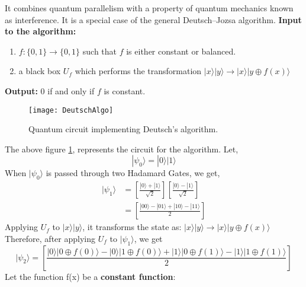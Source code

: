 \documentclass[12pt]{report}
\begin{document}
It combines quantum parallelism with a property of quantum mechanics known as interference. It is a special case of the general Deutsch–Jozsa algorithm. \newline
\textbf{Input to the algorithm:}
\begin{enumerate}
	\item $f:  \{0,1\} \to \{0,1\}$ such that ${f}$ is either constant or balanced.
	\item a black box $U_{f}$ which performs the transformation  $|x\rangle|y\rangle \to |x\rangle|y\oplus f(x)\rangle$
\end{enumerate}
\textbf{Output:} 0 if and only if $f$ is constant.
\begin{figure}[h]
\centering
\texttt{[image: DeutschAlgo]}
\caption{Quantum circuit implementing Deutsch's algorithm.}
\label{fig:deutschalgo}
\end{figure}
\newline The above figure \ref{fig:deutschalgo}, represents the circuit for the algorithm.
\linebreak
Let,
\begin{equation}
|\psi_{0}\rangle = |0\rangle|1\rangle
\end{equation} 
\newline
When $|\psi_{0}\rangle$ is passed through two Hadamard Gates, we get,\newline
\begin{equation}
\begin{split}
|\psi_{1}\rangle & = \left[\frac{|0\rangle+|1\rangle}{\sqrt{2}}\right]\left[\frac{|0\rangle-|1\rangle}{\sqrt{2}}\right] \\
&= \left[\frac{|00\rangle - |01\rangle + |10\rangle -|11\rangle}{2}\right] 
\end{split} 
\end{equation}
\newline
Applying $U_{f}$ to $|x\rangle|y\rangle$, it transforms the state  as:  $|x\rangle|y\rangle \to |x\rangle|y\oplus f(x)\rangle$\newline
Therefore, after applying $U_{f}$ to $|\psi_{1}\rangle$, we get \newline 
\begin{equation}
|\psi_{2}\rangle = \left[\frac{|0\rangle|0\oplus f(0)\rangle - |0\rangle|1\oplus f(0)\rangle + |1\rangle|0\oplus f(1)\rangle - |1\rangle|1\oplus f(1)\rangle }{2}\right]
\end{equation} \newline
Let the function f(x) be a \textbf{constant function}:
\end{document}
